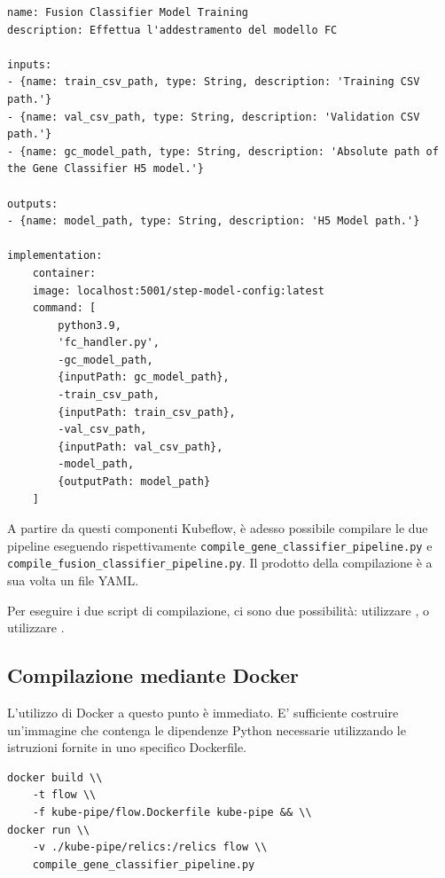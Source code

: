 \begin{code}
\label{code:apx:a:yaml}
\begin{verbatim}
name: Fusion Classifier Model Training
description: Effettua l'addestramento del modello FC

inputs:
- {name: train_csv_path, type: String, description: 'Training CSV path.'}
- {name: val_csv_path, type: String, description: 'Validation CSV path.'}
- {name: gc_model_path, type: String, description: 'Absolute path of the Gene Classifier H5 model.'}

outputs:
- {name: model_path, type: String, description: 'H5 Model path.'}

implementation:
    container:
    image: localhost:5001/step-model-config:latest
    command: [
        python3.9,
        'fc_handler.py',
        -gc_model_path, 
        {inputPath: gc_model_path},
        -train_csv_path, 
        {inputPath: train_csv_path},
        -val_csv_path, 
        {inputPath: val_csv_path},
        -model_path, 
        {outputPath: model_path}
    ]
\end{verbatim}
\end{code}

A partire da questi componenti Kubeflow, è adesso possibile compilare le due pipeline eseguendo rispettivamente {\small \verb|compile_gene_classifier_pipeline.py|} e {\small \verb|compile_fusion_classifier_pipeline.py|}. Il prodotto della compilazione è a sua volta un file YAML.

Per eseguire i due script di compilazione, ci sono due possibilità: utilizzare , o utilizzare . 

\subsection{Compilazione mediante Docker}

L'utilizzo di Docker a questo punto è immediato. E' sufficiente costruire un'immagine che contenga le dipendenze Python necessarie utilizzando le istruzioni fornite in uno specifico Dockerfile.

\begin{small}
\begin{Verbatim}[commandchars=\\\{\}]
docker build \\
    -t flow \\
    -f kube-pipe/flow.Dockerfile kube-pipe && \\
docker run \\
    -v ./kube-pipe/relics:/relics flow \\
    compile_gene_classifier_pipeline.py
\end{Verbatim}
\end{small}

